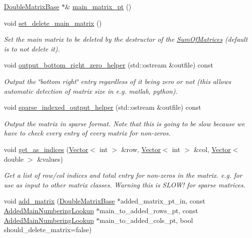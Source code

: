 \begin{DoxyCompactItemize}
\hyperlink{classoomph_1_1DoubleMatrixBase}{Double\+Matrix\+Base} $\ast$\& \hyperlink{classoomph_1_1SumOfMatrices_affa3ce9dd151fba3d33ecfffa5523c74}{main\+\_\+matrix\+\_\+pt} ()
\item 
void \hyperlink{classoomph_1_1SumOfMatrices_a873f5f3e937c1fa203506b2ccc81bd2e}{set\+\_\+delete\+\_\+main\+\_\+matrix} ()
\begin{DoxyCompactList}\small\item\em Set the main matrix to be deleted by the destructor of the \hyperlink{classoomph_1_1SumOfMatrices}{Sum\+Of\+Matrices} (default is to not delete it). \end{DoxyCompactList}\item 
void \hyperlink{classoomph_1_1SumOfMatrices_a13408a013cf37a9455b9813b7a19fb0e}{output\+\_\+bottom\+\_\+right\+\_\+zero\+\_\+helper} (std\+::ostream \&outfile) const
\begin{DoxyCompactList}\small\item\em Output the \char`\"{}bottom right\char`\"{} entry regardless of it being zero or not (this allows automatic detection of matrix size in e.\+g. matlab, python). \end{DoxyCompactList}\item 
void \hyperlink{classoomph_1_1SumOfMatrices_af93e5663c282ab73bc01c8dff58d0e82}{sparse\+\_\+indexed\+\_\+output\+\_\+helper} (std\+::ostream \&outfile) const
\begin{DoxyCompactList}\small\item\em Output the matrix in sparse format. Note that this is going to be slow because we have to check every entry of every matrix for non-\/zeros. \end{DoxyCompactList}\item 
void \hyperlink{classoomph_1_1SumOfMatrices_abc094faeb49c465a2907830afe71ab79}{get\+\_\+as\+\_\+indices} (\hyperlink{classoomph_1_1Vector}{Vector}$<$ int $>$ \&row, \hyperlink{classoomph_1_1Vector}{Vector}$<$ int $>$ \&col, \hyperlink{classoomph_1_1Vector}{Vector}$<$ double $>$ \&values)
\begin{DoxyCompactList}\small\item\em Get a list of row/col indices and total entry for non-\/zeros in the matrix. e.\+g. for use as input to other matrix classes. Warning this is S\+L\+O\+W! for sparse matrices. \end{DoxyCompactList}\item 
void \hyperlink{classoomph_1_1SumOfMatrices_a950924dfc285c908aac317f3be4fd158}{add\+\_\+matrix} (\hyperlink{classoomph_1_1DoubleMatrixBase}{Double\+Matrix\+Base} $\ast$added\+\_\+matrix\+\_\+pt\+\_\+in, const \hyperlink{classoomph_1_1AddedMainNumberingLookup}{Added\+Main\+Numbering\+Lookup} $\ast$main\+\_\+to\+\_\+added\+\_\+rows\+\_\+pt, const \hyperlink{classoomph_1_1AddedMainNumberingLookup}{Added\+Main\+Numbering\+Lookup} $\ast$main\+\_\+to\+\_\+added\+\_\+cols\+\_\+pt, bool should\+\_\+delete\+\_\+matrix=false)

\end{DoxyCompactItemize}
